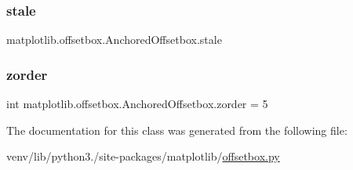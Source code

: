 \subsubsection{\texorpdfstring{stale}{stale}}
{\footnotesize\ttfamily matplotlib.\+offsetbox.\+Anchored\+Offsetbox.\+stale}

\mbox{\label{classmatplotlib_1_1offsetbox_1_1AnchoredOffsetbox_ac4ddd379ba84648d93746f29c34c6a29}} 
\subsubsection{\texorpdfstring{zorder}{zorder}}
{\footnotesize\ttfamily int matplotlib.\+offsetbox.\+Anchored\+Offsetbox.\+zorder = 5\hspace{0.3cm}{\ttfamily [static]}}



The documentation for this class was generated from the following file\+:\begin{DoxyCompactItemize}
\item 
venv/lib/python3./site-\/packages/matplotlib/\hyperlink{offsetbox_8py}{offsetbox.\+py}\end{DoxyCompactItemize}
